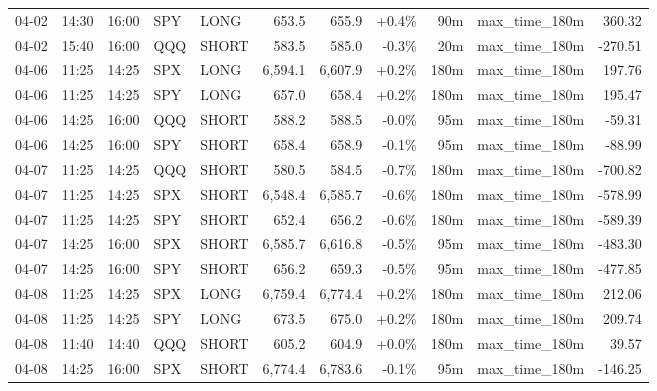 \documentclass[11pt,a4paper,twoside]{article}
\begin{document}
\begin{center}
\begin{longtable}{>{\color{txtmain}}l l l l l r r r r >{\color{txtmain}}l r}
04-02 & 14:30 & 16:00 & SPY & LONG & 653.5 & 655.9 & \textcolor{wingreen}{+0.4\%} & 90m & max\_time\_180m & \textcolor{wingreen}{360.32} \\
04-02 & 15:40 & 16:00 & QQQ & SHORT & 583.5 & 585.0 & \textcolor{lossred}{-0.3\%} & 20m & max\_time\_180m & \textcolor{lossred}{-270.51} \\
04-06 & 11:25 & 14:25 & SPX & LONG & 6,594.1 & 6,607.9 & \textcolor{wingreen}{+0.2\%} & 180m & max\_time\_180m & \textcolor{wingreen}{197.76} \\
04-06 & 11:25 & 14:25 & SPY & LONG & 657.0 & 658.4 & \textcolor{wingreen}{+0.2\%} & 180m & max\_time\_180m & \textcolor{wingreen}{195.47} \\
04-06 & 14:25 & 16:00 & QQQ & SHORT & 588.2 & 588.5 & \textcolor{lossred}{-0.0\%} & 95m & max\_time\_180m & \textcolor{lossred}{-59.31} \\
04-06 & 14:25 & 16:00 & SPY & SHORT & 658.4 & 658.9 & \textcolor{lossred}{-0.1\%} & 95m & max\_time\_180m & \textcolor{lossred}{-88.99} \\
04-07 & 11:25 & 14:25 & QQQ & SHORT & 580.5 & 584.5 & \textcolor{lossred}{-0.7\%} & 180m & max\_time\_180m & \textcolor{lossred}{-700.82} \\
04-07 & 11:25 & 14:25 & SPX & SHORT & 6,548.4 & 6,585.7 & \textcolor{lossred}{-0.6\%} & 180m & max\_time\_180m & \textcolor{lossred}{-578.99} \\
04-07 & 11:25 & 14:25 & SPY & SHORT & 652.4 & 656.2 & \textcolor{lossred}{-0.6\%} & 180m & max\_time\_180m & \textcolor{lossred}{-589.39} \\
04-07 & 14:25 & 16:00 & SPX & SHORT & 6,585.7 & 6,616.8 & \textcolor{lossred}{-0.5\%} & 95m & max\_time\_180m & \textcolor{lossred}{-483.30} \\
04-07 & 14:25 & 16:00 & SPY & SHORT & 656.2 & 659.3 & \textcolor{lossred}{-0.5\%} & 95m & max\_time\_180m & \textcolor{lossred}{-477.85} \\
04-08 & 11:25 & 14:25 & SPX & LONG & 6,759.4 & 6,774.4 & \textcolor{wingreen}{+0.2\%} & 180m & max\_time\_180m & \textcolor{wingreen}{212.06} \\
04-08 & 11:25 & 14:25 & SPY & LONG & 673.5 & 675.0 & \textcolor{wingreen}{+0.2\%} & 180m & max\_time\_180m & \textcolor{wingreen}{209.74} \\
04-08 & 11:40 & 14:40 & QQQ & SHORT & 605.2 & 604.9 & \textcolor{wingreen}{+0.0\%} & 180m & max\_time\_180m & \textcolor{wingreen}{39.57} \\
04-08 & 14:25 & 16:00 & SPX & SHORT & 6,774.4 & 6,783.6 & \textcolor{lossred}{-0.1\%} & 95m & max\_time\_180m & \textcolor{lossred}{-146.25} \\

\end{longtable}
\end{center}
\end{document}
